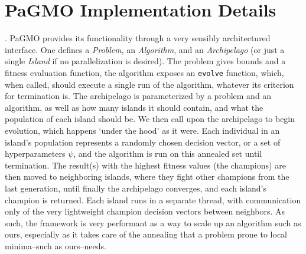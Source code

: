 \section{PaGMO Implementation Details}
.
PaGMO provides its functionality through a very sensibly architectured interface. One defines a \emph{Problem}, an \emph{Algorithm}, and an \emph{Archipelago} (or just a single \emph{Island} if no parallelization is desired). The problem gives bounds and a fitness evaluation function, the algorithm exposes an \texttt{evolve} function, which, when called, should execute a single run of the algorithm, whatever its criterion for termination is. The archipelago is parameterized by a problem and an algorithm, as well as how many islands it should contain, and what the population of each island should be. We then call upon the archipelago to begin evolution, which happens `under the hood' as it were. Each individual in an island's population represents a randomly chosen decision vector, or a set of hyperparameters \(\psi\), and the algorithm is run on this annealed set until termination. The result(s) with the highest fitness values (the champions) are then moved to neighboring islands, where they fight other champions from the last generation, until finally the archipelago converges, and each island's champion is returned. Each island runs in a separate thread, with communication only of the very lightweight champion decision vectors between neighbors. As such, the framework is very performant as a way to scale up an algorithm such as ours, especially as it takes care of the annealing that a problem prone to local minima--such as ours--needs.